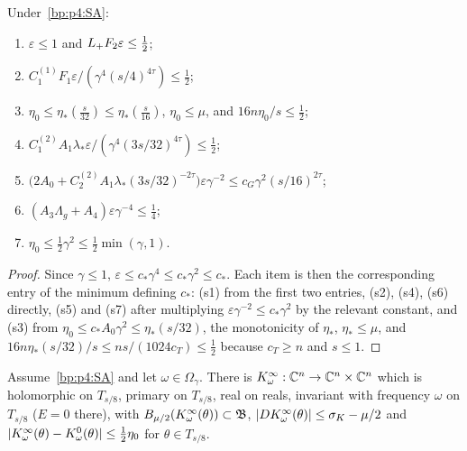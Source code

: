 \begin{lemma}\label{bp:p4:smallness}
Under~\eqref{bp:p4:SA}:
\begin{enumerate}[label=(s\arabic*)]
\item $\varepsilon\le1$ and $L_{+} F_2\varepsilon\le\frac12$;
\item $C_1^{(1)}F_1\varepsilon/(\gamma^4(s/4)^{4\tau})\le\frac12$;
\item $\eta_0\le\eta_*(\frac s{32})\le\eta_*(\frac s{16})$, $\eta_0\le\mu$, and $16n\eta_0/s\le\frac12$;
\item $C_1^{(2)}A_1\lambda_*\varepsilon/(\gamma^4(3s/32)^{4\tau})\le\frac12$;
\item $\bigl(2A_0+C_2^{(2)}A_1\lambda_*(3s/32)^{-2\tau}\bigr)\varepsilon\gamma^{-2}\le c_G\gamma^2(s/16)^{2\tau}$;
\item $(A_3\Lambda_g+A_4)\varepsilon\gamma^{-4}\le\frac14$;
\item $\eta_0\le\frac12\gamma^2\le\frac12\min(\gamma,1)$.
\end{enumerate}
\end{lemma}

\begin{proof}
\label{step:p4:small-proof}
Since $\gamma\le1$, $\varepsilon\le c_*\gamma^4\le c_*\gamma^2\le c_*$. Each item is then the
corresponding entry of the minimum defining $c_*$: (s1) from the first two entries, (s2), (s4),
(s6) directly, (s5) and (s7) after multiplying $\varepsilon\gamma^{-2}\le c_*\gamma^2$ by the
relevant constant, and (s3) from $\eta_0\le c_*A_0\gamma^2\le\eta_*(s/32)$, the monotonicity of
$\eta_*$, $\eta_*\le\mu$, and $16n\eta_*(s/32)/s\le ns/(1024c_T)\le\frac12$ because
$c_T\ge n$ and $s\le1$.
\end{proof}

\begin{theorem}\label{bp:p4:apply}
Assume~\eqref{bp:p4:SA} and let $\omega\in\Omega_\gamma$. There is
$K^\infty_\omega:\mathbb{C}^n\to\mathbb{C}^n\times\mathbb{C}^n$ which is holomorphic on $T_{s/8}$, primary on $T_{s/8}$,
real on reals, invariant with frequency $\omega$ on $T_{s/8}$ ($E=0$ there), with
$B_{\mu/2}(K^\infty_\omega(\theta))\subset\mathfrak{B}$, $\lvert DK^\infty_\omega(\theta)\rvert\le\sigma_K-\mu/2$ and
$\lvert K^\infty_\omega(\theta)-K^0_\omega(\theta)\rvert\le\frac12\eta_0$ for $\theta\in T_{s/8}$.
\end{theorem}

